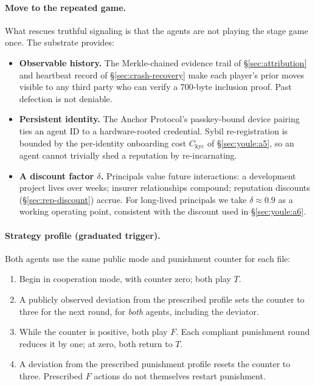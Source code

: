 \documentclass[11pt,a4paper]{article}
\theoremstyle{definition}
\theoremstyle{remark}
\begin{document}
\paragraph{Move to the repeated game.}
What rescues truthful signaling is that the agents are not playing the stage game once. The substrate provides:
\begin{itemize}[nosep]
  \item \textbf{Observable history.} The Merkle-chained evidence trail of \S\ref{sec:attribution} and heartbeat record of \S\ref{sec:crash-recovery} make each player's prior moves visible to any third party who can verify a 700-byte inclusion proof. Past defection is not deniable.
  \item \textbf{Persistent identity.} The Anchor Protocol's passkey-bound device pairing~ ties an agent ID to a hardware-rooted credential. Sybil re-registration is bounded by the per-identity onboarding cost $C_{\mathrm{kyc}}$ of \S\ref{sec:youle:a5}, so an agent cannot trivially shed a reputation by re-incarnating.
  \item \textbf{A discount factor $\delta$.} Principals value future interactions: a development project lives over weeks; insurer relationships compound; reputation discounts (\S\ref{sec:rep-discount}) accrue. For long-lived principals we take $\delta \approx 0.9$ as a working operating point, consistent with the discount used in \S\ref{sec:youle:a6}.
\end{itemize}

\paragraph{Strategy profile (graduated trigger).}
Both agents use the same public mode and punishment counter for each file:
\begin{enumerate}[nosep]
  \item Begin in cooperation mode, with counter zero; both play $T$.
  \item A publicly observed deviation from the prescribed profile sets the
    counter to three for the next round, for \emph{both} agents, including the deviator.
  \item While the counter is positive, both play $F$. Each compliant punishment
    round reduces it by one; at zero, both return to $T$.
  \item A deviation from the prescribed punishment profile resets the counter
    to three. Prescribed $F$ actions do not themselves restart punishment.
\end{enumerate}
\end{document}
